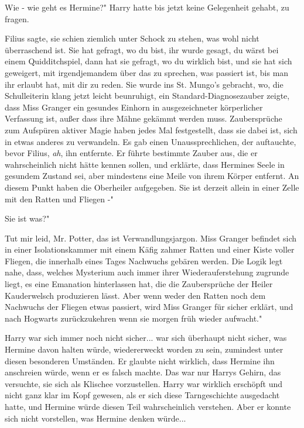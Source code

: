 \glqq Wie - wie geht es Hermine?" Harry hatte bis jetzt keine Gelegenheit
gehabt, zu fragen.

\glqq Filius sagte, sie schien ziemlich unter Schock zu stehen, was wohl nicht
überraschend ist. Sie hat gefragt, wo du bist, ihr wurde gesagt, du wärst bei
einem Quidditchspiel, dann hat sie gefragt, wo du wirklich bist, und sie hat
sich geweigert, mit irgendjemandem über das zu sprechen, was passiert ist, bis
man ihr erlaubt hat, mit dir zu reden. Sie wurde ins St. Mungo's gebracht,
wo\grqq{}, die Schulleiterin klang jetzt leicht beunruhigt, \glqq ein
Standard-Diagnosezauber zeigte, dass Miss Granger ein gesundes Einhorn in
ausgezeichneter körperlicher Verfassung ist, außer dass ihre Mähne gekämmt
werden muss. Zaubersprüche zum Aufspüren aktiver Magie haben jedes Mal
festgestellt, dass sie dabei ist, sich in etwas anderes zu verwandeln. Es gab
einen Unaussprechlichen, der auftauchte, bevor Filius, \emph{ah}, ihn entfernte.
Er führte bestimmte Zauber aus, die er wahrscheinlich nicht hätte kennen sollen,
und erklärte, dass Hermines Seele in gesundem Zustand sei, aber mindestens eine
Meile von ihrem Körper entfernt. An diesem Punkt haben die Oberheiler
aufgegeben. Sie ist derzeit allein in einer Zelle mit den Ratten und Fliegen -"

\glqq Sie ist was?"

\glqq Tut mir leid, Mr. Potter, das ist Verwandlungsjargon. Miss Granger
befindet sich in einer Isolationskammer mit einem Käfig zahmer Ratten und einer
Kiste voller Fliegen, die innerhalb eines Tages Nachwuchs gebären werden. Die
Logik legt nahe, dass, welches Mysterium auch immer ihrer Wiederauferstehung
zugrunde liegt, es eine Emanation hinterlassen hat, die die Zaubersprüche der
Heiler Kauderwelsch produzieren lässt. Aber wenn weder den Ratten noch dem
Nachwuchs der Fliegen etwas passiert, wird Miss Granger für sicher erklärt, und
nach Hogwarts zurückzukehren wenn sie morgen früh wieder aufwacht."

Harry war sich immer noch nicht sicher... war sich überhaupt nicht sicher, was
Hermine davon halten würde, wiedererweckt worden zu sein, zumindest unter diesen
besonderen Umständen. Er glaubte nicht wirklich, dass Hermine ihn anschreien
würde, wenn er es falsch machte. Das war nur Harrys Gehirn, das versuchte, sie
sich als Klischee vorzustellen. Harry war wirklich erschöpft und nicht ganz klar
im Kopf gewesen, als er sich diese Tarngeschichte ausgedacht hatte, und Hermine
würde diesen Teil wahrscheinlich verstehen. Aber er konnte sich nicht
vorstellen, was Hermine denken würde...

